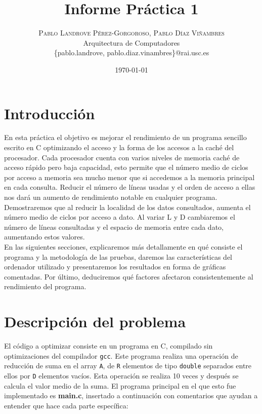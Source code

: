 \documentclass[a4paper,twocolumn]{article}
\title{Informe Práctica 1} %
\author{%
	\textsc{Pablo Landrove Pérez-Gorgoroso, Pablo Díaz Viñambres} \\[1ex] %
	\normalsize Arquitectura de Computadores\\
	\normalsize \{pablo.landrove, pablo.diaz.vinambres\}@rai.usc.es %
}
\date{\today} %
\begin{document}
	
	\maketitle
	
	
	\section{Introducción}
	
	En esta práctica el objetivo es mejorar el rendimiento de un programa sencillo escrito en C optimizando el acceso y la forma de los accesos a la caché del procesador.	Cada procesador cuenta con varios niveles de memoria caché de acceso rápido pero baja capacidad, esto permite que el número medio de ciclos por acceso a memoria sea mucho menor que si accedemos a la memoria principal en cada consulta. Reducir el número de líneas usadas y el orden de acceso a ellas nos dará un aumento de rendimiento notable en cualquier programa. \\
	
	Demostraremos que al reducir la localidad de los datos consultados, aumenta el número medio de ciclos por acceso a dato. Al variar L y D cambiaremos el número de líneas consultadas y el espacio de memoria entre cada dato, aumentando estos valores. \\
	
	En las siguientes secciones, explicaremos más detallamente en qué consiste el programa y la metodología de las pruebas, daremos las características del ordenador utilizado y presentaremos los resultados en forma de gráficas comentadas. Por último, deduciremos qué factores afectaron consistentemente al rendimiento del programa. \\
	
	\section{Descripción del problema}
	El código a optimizar consiste en un programa en C, compilado sin optimizaciones del compilador \texttt{gcc}. Este programa realiza una operación de reducción de suma en el array \texttt{A}, de \texttt{R} elementos de tipo \texttt{double} separados entre ellos por \texttt{D} elementos vacíos. Esta operación se realiza 10 veces y después se calcula el valor medio de la suma. El programa principal en el que esto fue implementado es \textbf{main.c}, insertado a continuación con comentarios que ayudan a entender que hace cada parte específica:
	
\end{document}
